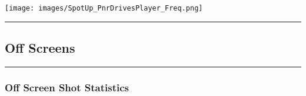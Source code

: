 \documentclass[a4paper,12pt]{article}
\begin{document}
\begin{table}[H]
{\begin{minipage}[t]{0.6\textwidth}
{\begin{tabular}
{{{{{{{{{{{{            \bottomrule
        \end{tabular}
        } %
    \end{minipage}
    } %
    \hfill %
    \begin{minipage}[c]{0.35\textwidth} %
        \flushright
        \texttt{[image: images/SpotUp\_PnrDrivesPlayer\_Freq.png]} %
    \end{minipage}
\end{table}

\vspace{-1em} %
\hrule height 1pt width 1\textwidth %
\vspace{1em} %
\clearpage











\subsection{Off Screens}

\vspace{1em} %
\hrule height 1pt width 1\textwidth %
\vspace{0em} %

\subsubsection{Off Screen Shot Statistics}
\end{document}
